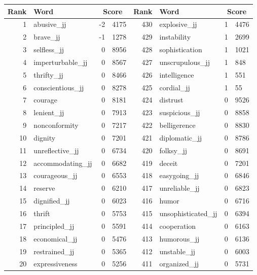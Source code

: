 \begin{table}[tbp]
    \begin{tabular}{| rlr@{.}l | rlr@{.}l |}
    \hline
    \textbf{Rank} & \textbf{Word} & \multicolumn{2}{c|}{\textbf{Score}} & \textbf{Rank} & \textbf{Word} & \multicolumn{2}{c|}{\textbf{Score}} \\
    \hline
    1 & abusive\_jj & -2 & 4175    &    430 & explosive\_jj & 1 & 4476 \\
    2 & brave\_jj & -1 & 1278    &    429 & instability & 1 & 2699 \\
    3 & selfless\_jj & 0 & 8956    &    428 & sophistication & 1 & 1021 \\
    4 & imperturbable\_jj & 0 & 8567    &    427 & unscrupulous\_jj & 1 & 848 \\
    5 & thrifty\_jj & 0 & 8466    &    426 & intelligence & 1 & 551 \\
    6 & conscientious\_jj & 0 & 8278    &    425 & cordial\_jj & 1 & 55 \\
    7 & courage & 0 & 8181    &    424 & distrust & 0 & 9526 \\
    8 & lenient\_jj & 0 & 7913    &    423 & suspicious\_jj & 0 & 8858 \\
    9 & nonconformity & 0 & 7217    &    422 & belligerence & 0 & 8830 \\
    10 & dignity & 0 & 7201    &    421 & diplomatic\_jj & 0 & 8786 \\
    11 & unreflective\_jj & 0 & 6734    &    420 & folksy\_jj & 0 & 8691 \\
    12 & accommodating\_jj & 0 & 6682    &    419 & deceit & 0 & 7201 \\
    13 & courageous\_jj & 0 & 6553    &    418 & easygoing\_jj & 0 & 6846 \\
    14 & reserve & 0 & 6210    &    417 & unreliable\_jj & 0 & 6823 \\
    15 & dignified\_jj & 0 & 6023    &    416 & humor & 0 & 6716 \\
    16 & thrift & 0 & 5753    &    415 & unsophisticated\_jj & 0 & 6394 \\
    17 & principled\_jj & 0 & 5591    &    414 & cooperation & 0 & 6163 \\
    18 & economical\_jj & 0 & 5476    &    413 & humorous\_jj & 0 & 6136 \\
    19 & restrained\_jj & 0 & 5365    &    412 & unstable\_jj & 0 & 6003 \\
    20 & expressiveness & 0 & 5256    &    411 & organized\_jj & 0 & 5731 \\

\end{tabular}
\end{table}
